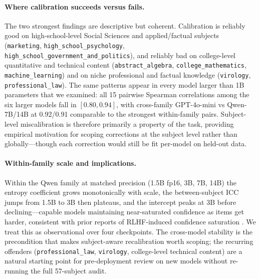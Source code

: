 \documentclass[11pt]{article}
\begin{document}
\paragraph{Where calibration succeeds versus fails.}
The two strongest findings are descriptive but coherent. Calibration is
reliably good on high-school-level Social Sciences and applied/factual
subjects (\texttt{marketing}, \texttt{high\_school\_psychology},
\texttt{high\_school\_government\_and\_politics}), and reliably bad on
college-level quantitative and technical content (\texttt{abstract\_algebra},
\texttt{college\_mathematics}, \texttt{machine\_learning}) and on niche
professional and factual knowledge (\texttt{virology},
\texttt{professional\_law}). The same patterns appear in every model larger
than 1B parameters that we examined: all 15 pairwise Spearman correlations
among the six larger models fall in $[0.80, 0.94]$, with cross-family
GPT-4o-mini vs Qwen-7B/14B at 0.92/0.91 comparable to the strongest
within-family pairs. Subject-level miscalibration is therefore primarily a
property of the task, providing empirical motivation for scoping corrections
at the subject level rather than globally---though each correction would
still be fit per-model on held-out data.

\paragraph{Within-family scale and implications.}
Within the Qwen family at matched precision (1.5B fp16, 3B, 7B, 14B) the
entropy coefficient grows monotonically with scale, the between-subject ICC
jumps from 1.5B to 3B then plateaus, and the intercept peaks at 3B before
declining---capable models maintaining near-saturated confidence as items get
harder, consistent with prior reports of RLHF-induced confidence saturation
\citep{kadavath2022language, nakkiran2025trained, yaldiz2026balancing}. We
treat this as observational over four checkpoints. The cross-model stability
is the precondition that makes subject-aware recalibration worth scoping;
the recurring offenders (\texttt{professional\_law}, \texttt{virology},
college-level technical content) are a natural starting point for
pre-deployment review on new models without re-running the full 57-subject
audit.
\end{document}
